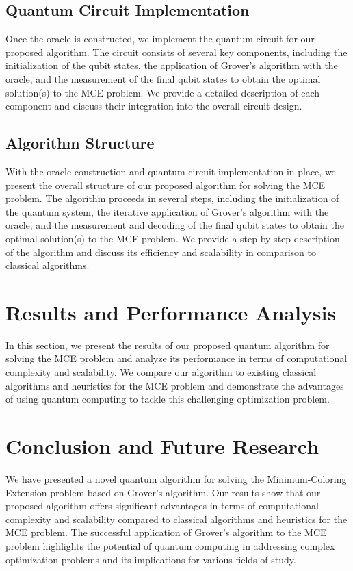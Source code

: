 \subsection{Quantum Circuit Implementation}

Once the oracle is constructed, we implement the quantum circuit for our proposed algorithm. The circuit consists of several key components, including the initialization of the qubit states, the application of Grover's algorithm with the oracle, and the measurement of the final qubit states to obtain the optimal solution(s) to the MCE problem. We provide a detailed description of each component and discuss their integration into the overall circuit design.

\subsection{Algorithm Structure}

With the oracle construction and quantum circuit implementation in place, we present the overall structure of our proposed algorithm for solving the MCE problem. The algorithm proceeds in several steps, including the initialization of the quantum system, the iterative application of Grover's algorithm with the oracle, and the measurement and decoding of the final qubit states to obtain the optimal solution(s) to the MCE problem. We provide a step-by-step description of the algorithm and discuss its efficiency and scalability in comparison to classical algorithms.

\section{Results and Performance Analysis}
\label{sec:results}

In this section, we present the results of our proposed quantum algorithm for solving the MCE problem and analyze its performance in terms of computational complexity and scalability. We compare our algorithm to existing classical algorithms and heuristics for the MCE problem and demonstrate the advantages of using quantum computing to tackle this challenging optimization problem.

\section{Conclusion and Future Research}
\label{sec:conclusion}

We have presented a novel quantum algorithm for solving the Minimum-Coloring Extension problem based on Grover's algorithm. Our results show that our proposed algorithm offers significant advantages in terms of computational complexity and scalability compared to classical algorithms and heuristics for the MCE problem. The successful application of Grover's algorithm to the MCE problem highlights the potential of quantum computing in addressing complex optimization problems and its implications for various fields of study.

